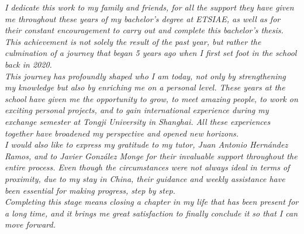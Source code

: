 %

\vspace*{\fill}
\begin{flushright} 
    \textit{I dedicate this work to my family and friends, for all the support they have given me throughout these years of my bachelor's degree at ETSIAE, as well as for their constant encouragement to carry out and complete this bachelor's thesis. This achievement is not solely the result of the past year, but rather the culmination of a journey that began 5 years ago when I first set foot in the school back in 2020.} \\
    \vspace{1em}
    \textit{This journey has profoundly shaped who I am today, not only by strengthening my knowledge but also by enriching me on a personal level. These years at the school have given me the opportunity to grow, to meet amazing people, to work on exciting personal projects, and to gain international experience during my exchange semester at Tongji University in Shanghai. All these experiences together have broadened my perspective and opened new horizons.} \\
    \vspace{1em}
    \textit{I would also like to express my gratitude to my tutor, Juan Antonio Hernández Ramos, and to Javier González Monge for their invaluable support throughout the entire process. Even though the circumstances were not always ideal in terms of proximity, due to my stay in China, their guidance and weekly assistance have been essential for making progress, step by step.}\\
    \vspace{1em}
    \textit{Completing this stage means closing a chapter in my life that has been present for a long time, and it brings me great satisfaction to finally conclude it so that I can move forward.}\\
\end{flushright}
\vspace{20em}

